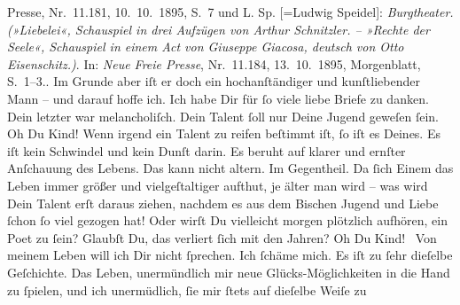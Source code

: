 \begin{ledgroupsized}[t]{13cm}
{{{{                        Presse}, Nr. 11.181, 10. 10. 1895,
                     S. 7 und L. Sp. [=Ludwig Speidel]: \emph{Burgtheater. (»Liebelei«, Schauspiel in drei Aufzügen von
                        Arthur Schnitzler. – »Rechte der Seele«, Schauspiel in einem Act von
                        Giuseppe Giacosa, deutsch von Otto Eisenschitz.)}. In: \emph{Neue Freie Presse}, Nr. 11.184, 13. 10. 1895, Morgenblatt, S. 1–3.}}}\label{K_L02762-9h}. Im Grunde {\pb}aber iſt er doch ein hochanſtändiger und
               kunſtliebender Mann – und darauf hoffe ich.\pend
           \pstart
           Ich habe Dir für ſo viele liebe Briefe zu danken. Dein letzter war melancholiſch.
               Dein Talent ſoll nur Deine Jugend geweſen ſein. Oh Du Kind! Wenn irgend ein Talent zu
               reifen beſtimmt iſt, ſo iſt es Deines. Es iſt kein Schwindel und kein Dunſt darin. Es
               beruht auf klarer {\pb}und  ernſter Anſchauung des Lebens.  Das
               kann nicht altern. Im Gegentheil. Da ſich Einem das Leben immer größer und
               vielgeſtaltiger aufthut, je älter man wird – was wird Dein Talent erſt daraus ziehen,
                   nachdem es aus dem Bischen Jugend und Liebe
               ſchon ſo viel gezogen hat! Oder wirſt Du vielleicht morgen plötzlich {\pb}aufhören, ein Poet zu ſein? Glaubſt Du, das verliert
               ſich mit den Jahren? Oh Du Kind! {\dotsfive}\pend
           \pstart
           Von meinem Leben will ich Dir nicht ſprechen. Ich ſchäme mich. Es iſt zu ſehr
               dieſelbe Geſchichte. Das Leben, unermündlich mir 
               neue Glücks-Möglichkeiten in die Hand zu ſpielen, und {\pb}ich unermüdlich, ſie mir ſtets auf dieſelbe Weiſe zu

\end{ledgroupsized}

